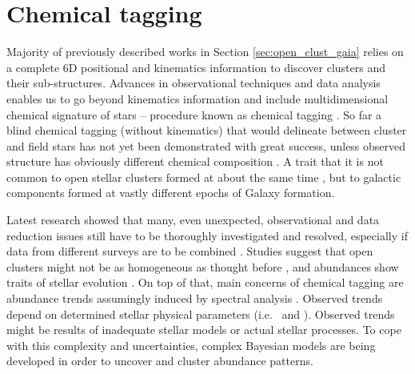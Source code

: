 \section{Chemical tagging}
Majority of previously described works in Section \ref{sec:open_clust_gaia} relies on a complete 6D positional and kinematics information to discover clusters and their sub-structures. Advances in observational techniques and data analysis enables us to go beyond kinematics information and include multidimensional chemical signature of stars -- procedure known as chemical tagging \cite{2002ARA&A..40..487F, 2010ApJ...721..582B}. So far a blind chemical tagging (without kinematics) that would delineate between cluster and field stars has not yet been demonstrated with great success, unless observed structure has obviously different chemical composition \cite{2016ApJ...833..262H}. A trait that it is not common to open stellar clusters formed at about the same time \cite{2019A&A...629A..34G}, but to galactic components formed at vastly different epochs \cite{2018A&A...619A.125A} of Galaxy formation.

Latest research showed that many, even unexpected, observational and data reduction issues still have to be thoroughly investigated and resolved, especially if data from different surveys are to be combined \cite{2019ARA&A..57..571J}. Studies suggest that open clusters might not be as homogeneous as thought before \cite{2016ApJ...817...49B, 2018MNRAS.473.4612K}, and abundances show traits of stellar evolution \cite{2015A&A...577A..47B, 2017ApJ...840...99D, 2018MNRAS.478..425B}. On top of that, main concerns of chemical tagging are abundance trends assumingly induced by spectral analysis \cite{2016ApJ...817...49B, 2019arXiv191208539C, 2020arXiv200103179B}. Observed trends depend on determined stellar physical parameters (i.e. \Teff\ and \vsin). Observed trends might be results of inadequate stellar models or actual stellar processes. To cope with this complexity and uncertainties, complex Bayesian models are being developed \cite{2016ApJ...817...49B, 2019ApJ...887...73C} in order to uncover and cluster abundance patterns.


